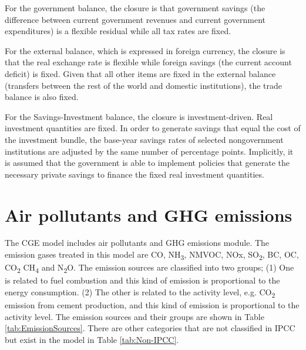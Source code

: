 \documentclass[10pt,a4paper,titlepage,dvipdfmx]{book}
\begin{document}
For the government balance, the closure is that government savings (the difference between current government revenues and current government expenditures) is a flexible residual while all tax rates are fixed. 

For the external balance, which is expressed in foreign currency, the closure is that the real exchange rate is flexible while foreign savings (the current account deficit) is fixed. Given that all other items are fixed in the external balance (transfers between the rest of the world and domestic institutions), the trade balance is also fixed. 

For the Savings-Investment balance, the closure is investment-driven. Real investment quantities are fixed. In order to generate savings that equal the cost of the investment bundle, the base-year savings rates of selected nongovernment institutions are adjusted by the same number of percentage points. Implicitly, it is assumed that the government is able to implement policies that generate the necessary private savings to finance the fixed real investment quantities.

\section{\label{sec:Stru-AirPolGHGEmi}Air pollutants and GHG emissions}

The CGE model includes air pollutants and GHG emissions module. The emission gases treated in this model are CO, NH\textsubscript{3}, NMVOC, NOx, SO\textsubscript{2}, BC, OC, CO\textsubscript{2} CH\textsubscript{4} and N\textsubscript{2}O. The emission sources are classified into two groups; (1) One is related to fuel combustion and this kind of emission is proportional to the energy consumption. (2) The other is related to the activity level, e.g. CO\textsubscript{2} emission from cement production, and this kind of emission is proportional to the activity level. The emission sources and their groups are shown in Table \ref{tab:EmissionSources}. There are other categories that are not classified in IPCC but exist in the model in Table \ref{tab:Non-IPCC}.
\end{document}
